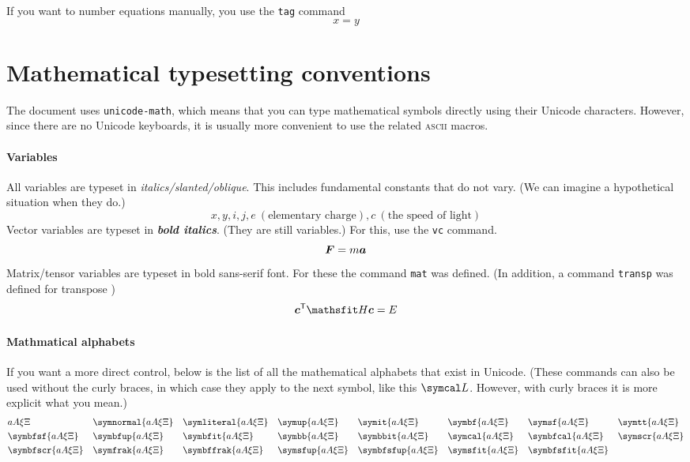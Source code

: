 \documentclass{article}
\begin{document}
If you want to number equations manually, you use the \texttt{tag} command
\[
x=y
\tag{4}
\]

\section{Mathematical typesetting conventions}
The document uses \texttt{unicode-math}, which means that you can type mathematical symbols directly using their Unicode characters. However, since there are no Unicode keyboards, it is usually more convenient to use the related \textsc{ascii} macros.

\paragraph{Variables} All variables are typeset in \textit{italics/slanted/oblique}. This includes fundamental constants that do not vary. (We can imagine a hypothetical situation when they do.)
\[
x, y, i, j, e\ (\textrm{elementary charge}), c\ (\textrm{the speed of light})
\]
Vector variables are typeset in \textbf{\textit{bold italics}}. (They are still variables.) For this, use the \texttt{vc} command.
\[
\bm{F} = m \bm{a}
\]
Matrix/tensor variables are typeset in bold sans-serif font. For these the command \texttt{mat} was defined. (In addition, a command \texttt{transp} was defined for transpose \transp)
\[
\vc{c}^\transp \mat{H} \vc{c} = E
\]

\paragraph{Mathmatical alphabets} If you want a more direct control, below is the list of all the mathematical alphabets that exist in Unicode. (These commands can also be used without the curly braces, in which case they apply to the next symbol, like this $\symcal L$. However, with curly braces it is more explicit what you mean.)
\begin{align*}
    &a A \xi \Xi                &
    &\symnormal{a A \xi \Xi}    &
    &\symliteral{a A \xi \Xi}   &
    &\symup{a A \xi \Xi}    &
    &\symit{a A \xi \Xi}    &
    &\symbf{a A \xi \Xi}   &
    &\symsf{a A \xi \Xi}    &
    &\symtt{a A \xi \Xi}    \\
    &\symbfsf{a A \xi \Xi}   &
    &\symbfup{a A \xi \Xi}   &
    &\symbfit{a A \xi \Xi}   &
    &\symbb{a A \xi \Xi}   &
    &\symbbit{a A \xi \Xi}   &
    &\symcal{a A \xi \Xi}   &
    &\symbfcal{a A \xi \Xi}   &
    &\symscr{a A \xi \Xi}    \\
    &\symbfscr{a A \xi \Xi}   &
    &\symfrak{a A \xi \Xi}   &
    &\symbffrak{a A \xi \Xi}   &
    &\symsfup{a A \xi \Xi}   &
    &\symbfsfup{a A \xi \Xi}    &
    &\symsfit{a A \xi \Xi}    &
    &\symbfsfit{a A \xi \Xi} \\
\end{align*}
\end{document}
